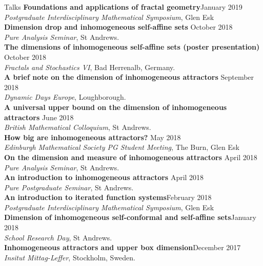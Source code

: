 \documentclass{resume} %
\begin{document}
\begin{rSection}{Talks}
\textbf{Foundations and applications of fractal geometry}\hfill January 2019 \\ \emph{Postgraduate Interdisciplinary Mathematical Symposium}, Glen Esk  \\
\textbf{Dimension drop and inhomogeneous self-affine sets} \hfill October 2018 \\ \emph{Pure Analysis Seminar}, St Andrews.\\
\textbf{The dimensions of inhomogeneous self-affine sets (poster presentation)} \hfill October 2018 \\ \emph{Fractals and Stochastics VI}, Bad Herrenalb, Germany.\\
\textbf{A brief note on the dimension of inhomogeneous attractors} \hfill September 2018 \\\emph{Dynamic Days Europe}, Loughborough.\\
\textbf{A universal upper bound on the dimension of inhomogeneous attractors} \hfill June 2018 \\\emph{British Mathematical Colloquium}, St Andrews.\\
\textbf{How big are inhomogeneous attractors?} \hfill May 2018 \\\emph{Edinburgh Mathematical Society PG Student Meeting}, The Burn, Glen Esk\\
\textbf{On the dimension and measure of inhomogeneous attractors} \hfill April 2018 \\\emph{Pure Analysis Seminar}, St Andrews.\\
\textbf{An introduction to inhomogeneous attractors}  \hfill April 2018\\ \emph{Pure Postgraduate Seminar}, St Andrews.\\
\textbf{An introduction to iterated function systems}\hfill February 2018 \\ \emph{Postgraduate Interdisciplinary Mathematical Symposium}, Glen Esk  \\
\textbf{Dimension of inhomogeneous self-conformal and self-affine sets}\hfill January 2018\\ \emph{School Research Day}, St Andrews.  \\
\textbf{Inhomogeneous attractors and upper box dimension}\hfill December 2017\\ \emph{Insitut Mittag-Leffer}, Stockholm, Sweden. \\

\end{rSection}
\end{document}
